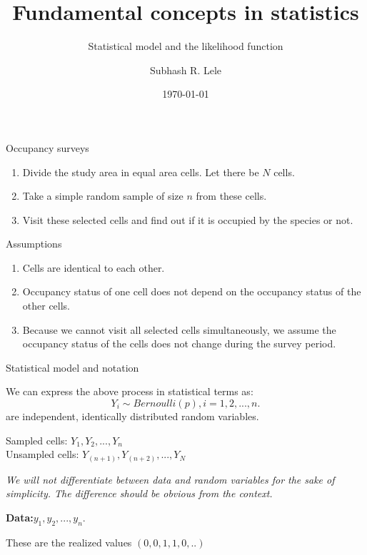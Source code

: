 \documentclass[10pt]{beamer}
\title{Fundamental concepts in statistics}
\subtitle {Statistical model and the likelihood function}
\author{Subhash R. Lele}
\institute {University of Alberta}
\institute{Department of Mathematical Sciences\\University of Alberta\\Canada\\\textit{Email: slele@ualberta.ca}}
\date{\today}
\begin{document}
\frame{\titlepage}


\begin{frame}
\begin{center}
\LARGE{Occupancy surveys}
\end{center}
\begin{enumerate} 
\item Divide the study area in equal area cells. Let there be $N$ cells. 
\pause
\item Take a simple random sample of size $n$ from these cells.
\pause
\item Visit these selected cells and find out if it is occupied by the species or not.
\end{enumerate}
\end{frame}

\begin{frame}
\begin{center}
\LARGE{Assumptions}
\end{center}
\begin{enumerate} 
\item Cells are identical to each other. 
\pause
\item Occupancy status of one cell does not depend on the occupancy status of the other cells.
\pause
\item Because we cannot visit all selected cells simultaneously, we assume the occupancy status of the cells does not change during the survey period.   
\end{enumerate}
\end{frame}

\begin{frame}
\begin{center}
\LARGE{Statistical model and notation}
\end{center}
We can express the above process in statistical terms as:
\begin{equation}
Y_i \sim Bernoulli(p), i=1,2,...,n.
\end{equation}
are independent, identically distributed random variables.\\
\begin{center}
 Sampled cells: $Y_1,Y_2,...,Y_n$\\
 Unsampled cells: $Y_{(n+1)},Y_{(n+2)},...,Y_N$\\
 \end{center}
 \emph {We will not differentiate between data and random variables for the sake of simplicity. The difference should be obvious from the context.}\\
\begin{center} \textbf {Data:}$y_1,y_2,...,y_n.$\\
\end{center}
 These are the realized values $(0,0,1,1,0,..)$\\
\end{frame}
\end{document}

